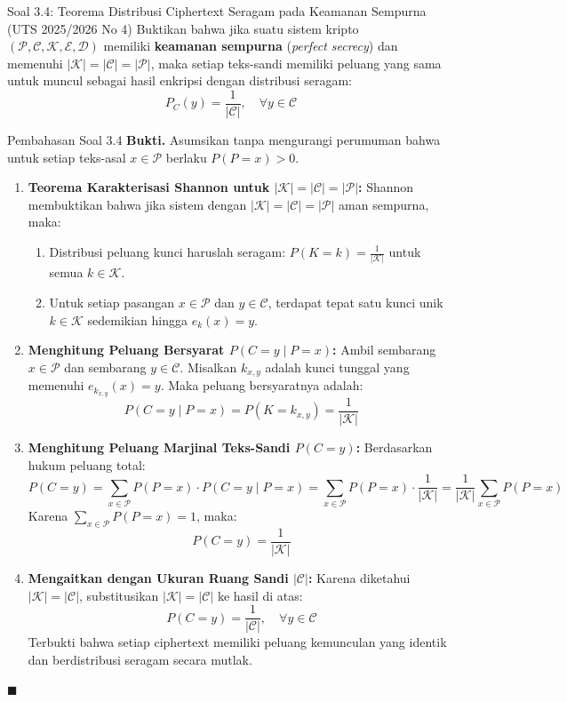 \documentclass[11pt,a4paper]{article}
\newenvironment{proof}{\noindent\textbf{Bukti.}}{\hfill$\blacksquare$\vspace{0.3em}}
\begin{document}
\vspace{0.4cm}

\begin{soalbox}{Soal 3.4: Teorema Distribusi Ciphertext Seragam pada Keamanan Sempurna (UTS 2025/2026 No 4)}
Buktikan bahwa jika suatu sistem kripto $(\mathcal{P}, \mathcal{C}, \mathcal{K}, \mathcal{E}, \mathcal{D})$ memiliki \textbf{keamanan sempurna} (\textit{perfect secrecy}) dan memenuhi $|\mathcal{K}| = |\mathcal{C}| = |\mathcal{P}|$, maka setiap teks-sandi memiliki peluang yang sama untuk muncul sebagai hasil enkripsi dengan distribusi seragam:
\[
P_C(y) = \frac{1}{|\mathcal{C}|}, \quad \forall y \in \mathcal{C}
\]
\end{soalbox}

\begin{solusibox}{Pembahasan Soal 3.4}
\begin{proof}
Asumsikan tanpa mengurangi perumuman bahwa untuk setiap teks-asal $x \in \mathcal{P}$ berlaku $P(P = x) > 0$.
\begin{enumerate}[leftmargin=*]
    \item \textbf{Teorema Karakterisasi Shannon untuk $|\mathcal{K}| = |\mathcal{C}| = |\mathcal{P}|$:}
    Shannon membuktikan bahwa jika sistem dengan $|\mathcal{K}| = |\mathcal{C}| = |\mathcal{P}|$ aman sempurna, maka:
    \begin{enumerate}
        \item Distribusi peluang kunci haruslah seragam: $P(K = k) = \frac{1}{|\mathcal{K}|}$ untuk semua $k \in \mathcal{K}$.
        \item Untuk setiap pasangan $x \in \mathcal{P}$ dan $y \in \mathcal{C}$, terdapat tepat satu kunci unik $k \in \mathcal{K}$ sedemikian hingga $e_k(x) = y$.
    \end{enumerate}
    \item \textbf{Menghitung Peluang Bersyarat $P(C = y \mid P = x)$:}
    Ambil sembarang $x \in \mathcal{P}$ dan sembarang $y \in \mathcal{C}$. Misalkan $k_{x,y}$ adalah kunci tunggal yang memenuhi $e_{k_{x,y}}(x) = y$.
    Maka peluang bersyaratnya adalah:
    \[
    P(C = y \mid P = x) = P(K = k_{x,y}) = \frac{1}{|\mathcal{K}|}
    \]
    \item \textbf{Menghitung Peluang Marjinal Teks-Sandi $P(C = y)$:}
    Berdasarkan hukum peluang total:
    \[
    P(C = y) = \sum_{x \in \mathcal{P}} P(P = x) \cdot P(C = y \mid P = x) = \sum_{x \in \mathcal{P}} P(P = x) \cdot \frac{1}{|\mathcal{K}|} = \frac{1}{|\mathcal{K}|} \sum_{x \in \mathcal{P}} P(P = x)
    \]
    Karena $\sum_{x \in \mathcal{P}} P(P = x) = 1$, maka:
    \[
    P(C = y) = \frac{1}{|\mathcal{K}|}
    \]
    \item \textbf{Mengaitkan dengan Ukuran Ruang Sandi $|\mathcal{C}|$:}
    Karena diketahui $|\mathcal{K}| = |\mathcal{C}|$, substitusikan $|\mathcal{K}| = |\mathcal{C}|$ ke hasil di atas:
    \[
    P(C = y) = \frac{1}{|\mathcal{C}|}, \quad \forall y \in \mathcal{C}
    \]
    Terbukti bahwa setiap ciphertext memiliki peluang kemunculan yang identik dan berdistribusi seragam secara mutlak.
\end{enumerate}
\end{proof}
\end{solusibox}
\end{document}
